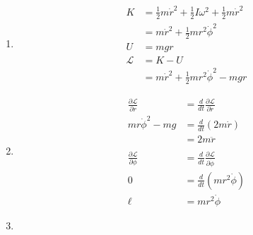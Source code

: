 \documentclass{article}
\begin{document}
\begin{enumerate}
  \item

        \begin{align*}
          K           & = \frac{1}{2} m \dot{r}^2 + \frac{1}{2} I \omega^2 + \frac{1}{2} m \dot{r}^2 \\
                      & = m \dot{r}^2 + \frac{1}{2} m r^2 \dot{\phi}^2                               \\
          U           & = m g r                                                                      \\
          \mathcal{L} & = K - U                                                                      \\
                      & = m \dot{r}^2 + \frac{1}{2} m r^2 \dot{\phi}^2 - m g r
        \end{align*}

  \item

        \begin{align*}
          \frac{\partial \mathcal{L}}{\partial r}    & = \frac{d}{d t} \frac{\partial \mathcal{L}}{\partial \dot{r}}    \\
          m r \dot{\phi}^2 - m g                     & = \frac{d}{d t} (2 m \dot{r})                                    \\
                                                     & = 2 m \ddot{r}                                                   \\ \\
          \frac{\partial \mathcal{L}}{\partial \phi} & = \frac{d}{d t} \frac{\partial \mathcal{L}}{\partial \dot{\phi}} \\
          0                                          & = \frac{d}{d t} (m r^2 \dot{\phi})                               \\
          \ell                                       & = m r^2 \dot{\phi}
        \end{align*}

  \item


\end{enumerate}
\end{document}
